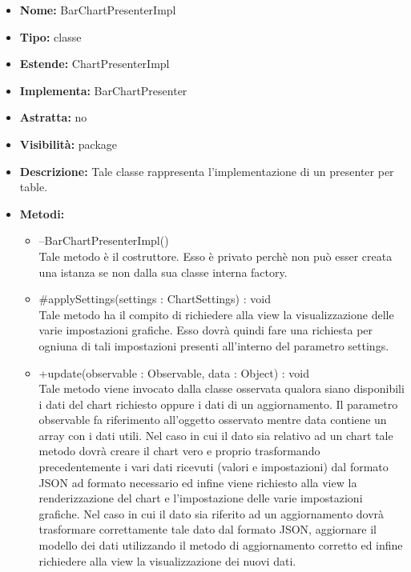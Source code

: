 			
			\begin{itemize}
			\item \textbf{Nome:} BarChartPresenterImpl
			\item \textbf{Tipo:} classe
			
		\item \textbf{Estende:}
		ChartPresenterImpl
		\item \textbf{Implementa:}
		BarChartPresenter
		\item \textbf{Astratta:}
		no
			\item \textbf{Visibilità:} package
			\item \textbf{Descrizione:} Tale classe rappresenta l'implementazione di un presenter per table.
			\item \textbf{Metodi:}
				\begin{itemize}
				\setlength{\itemsep}{5pt}
				
					\item[\ding{111}] {{--BarChartPresenterImpl()}} \\ [1mm] Tale metodo è il costruttore. Esso è privato perchè non può esser creata una istanza se non dalla sua classe interna factory.
					\item[\ding{111}] {{\#applySettings(settings : ChartSettings) : void}} \\ [1mm] Tale metodo ha il compito di richiedere alla view la visualizzazione delle varie impostazioni grafiche. Esso dovrà quindi fare una richiesta per ogniuna di tali impostazioni presenti all'interno del parametro settings.
					\item[\ding{111}] {{+update(observable : Observable, data : Object) : void}} \\ [1mm] Tale metodo viene invocato dalla classe osservata qualora siano disponibili i dati del chart richiesto oppure i dati di un aggiornamento. Il parametro observable fa riferimento all'oggetto osservato mentre data contiene un array con i dati utili. Nel caso in cui il dato sia relativo ad un chart tale metodo dovrà creare il chart vero e proprio trasformando precedentemente i vari dati ricevuti (valori e impostazioni) dal formato JSON ad formato necessario ed infine viene richiesto alla view la renderizzazione del chart e l'impostazione delle varie impostazioni grafiche. Nel caso in cui il dato sia riferito ad un aggiornamento dovrà trasformare correttamente tale dato dal formato JSON, aggiornare il modello dei dati utilizzando il metodo di aggiornamento corretto ed infine richiedere alla view la visualizzazione dei nuovi dati.
				\end{itemize}
		
			\end{itemize}

